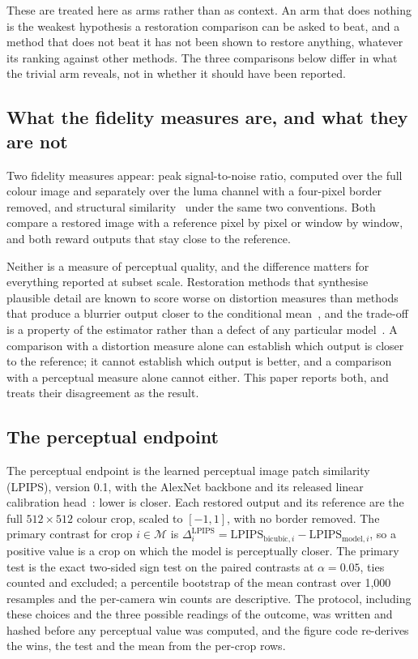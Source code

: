 These are treated here as arms rather than as context. An arm that does nothing
is the weakest hypothesis a restoration comparison can be asked to beat, and a
method that does not beat it has not been shown to restore anything, whatever
its ranking against other methods. The three comparisons below differ in what
the trivial arm reveals, not in whether it should have been reported.

\subsection{What the fidelity measures are, and what they are not}

Two fidelity measures appear: peak signal-to-noise ratio, computed over the full
colour image and separately over the luma channel with a four-pixel border
removed, and structural similarity~\cite{wang2004ssim} under the same two
conventions. Both compare a restored image with a reference pixel by pixel or
window by window, and both reward outputs that stay close to the reference.

Neither is a measure of perceptual quality, and the difference matters for
everything reported at subset scale. Restoration methods that synthesise
plausible detail are known to score worse on distortion measures than methods
that produce a blurrier output closer to the conditional
mean~\cite{blau2018perception,ledig2017srgan}, and the trade-off is a property
of the estimator rather than a defect of any particular
model~\cite{blau2018perception}. A comparison with a distortion measure alone
can establish which output is closer to the reference; it cannot establish
which output is better, and a comparison with a perceptual measure alone cannot
either. This paper reports both, and treats their disagreement as the result.

\subsection{The perceptual endpoint}

The perceptual endpoint is the learned perceptual image patch similarity
(LPIPS), version 0.1, with the AlexNet backbone and its released linear
calibration head~\cite{zhang2018lpips}: lower is closer. Each restored output
and its reference are the full \(512\times512\) colour crop, scaled to
\([-1,1]\), with no border removed. The primary contrast for crop
\(i\in\mathcal{M}\) is \(\Delta^{\mathrm{LPIPS}}_i =
\mathrm{LPIPS}_{\mathrm{bicubic},i}-\mathrm{LPIPS}_{\mathrm{model},i}\), so a
positive value is a crop on which the model is perceptually closer. The
primary test is the exact two-sided sign test on the \SubsetN{} paired
contrasts at \(\alpha=0.05\), ties counted and excluded; a percentile bootstrap
of the mean contrast over 1,000 resamples and the per-camera win counts are
descriptive. The protocol, including these choices and the three possible
readings of the outcome, was written and hashed before any perceptual value was
computed, and the figure code re-derives the wins, the test and the mean from
the per-crop rows.

